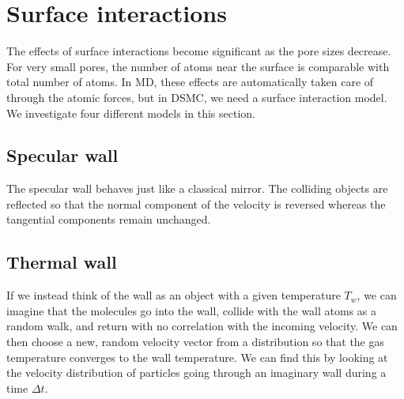 \section{Surface interactions}

The effects of surface interactions become significant as the pore sizes decrease. For very small pores, the number of atoms near the surface is comparable with total number of atoms. In MD, these effects are automatically taken care of through the atomic forces, but in DSMC, we need a surface interaction model. We investigate four different models in this section.
\subsection{Specular wall}
The specular wall behaves just like a classical mirror. The colliding objects are reflected so that the normal component of the velocity is reversed whereas the tangential components remain unchanged. 

\subsection{Thermal wall}
If we instead think of the wall as an object with a given temperature $T_w$, we can imagine that the molecules go into the wall, collide with the wall atoms as a random walk, and return with no correlation with the incoming velocity. We can then choose a new, random velocity vector from a distribution so that the gas temperature converges to the wall temperature. We can find this by looking at the velocity distribution of particles going through an imaginary wall during a time $\Delta t$.

